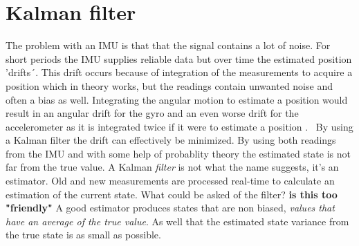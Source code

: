 \documentclass[a4paper,11pt]{kth-mag}
\begin{document}
\section{Kalman filter}
The problem with an IMU is that that the signal contains a lot of noise. For short periods the IMU supplies reliable data but over time the estimated position 'drifts´. This drift occurs because of integration of the measurements to acquire a position which in theory works, but the readings contain unwanted noise and often a bias as well. Integrating the angular motion to estimate a position would result in an angular drift for the gyro and an even worse drift for the accelerometer as it is integrated twice if it were to estimate a position \cite{MEMSdrift}. \
By using a Kalman filter the drift can effectively be minimized. By using both readings from the IMU and with some help of probablity theory the estimated state is not far from the true value.  A Kalman \textit{filter} is not what the name suggests, it's an estimator. Old and new measurements are processed real-time to calculate an estimation of the current state.
What could be asked of the filter? \textbf{is this too "friendly"}
A good estimator produces states that are non biased, \emph{values that have an average  of the true value}. As well that the estimated state variance from the true state is as small as possible.\cite{Simon2001}
\end{document}
